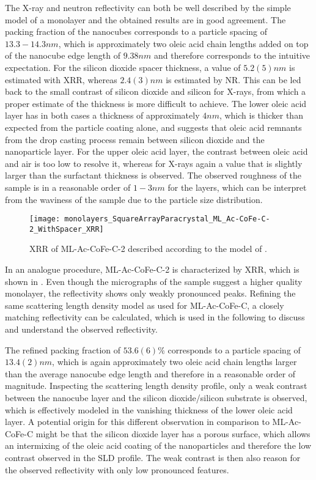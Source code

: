 \documentclass[\main/dresen_thesis.tex]{subfiles}
\begin{document}
  The X-ray and neutron reflectivity can both be well described by the simple model of a monolayer and the obtained results are in good agreement.
  The packing fraction of the nanocubes corresponds to a particle spacing of $13.3 - 14.3 \unit{nm}$, which is approximately two oleic acid chain lengths added on top of the nanocube edge length of $9.38 \unit{nm}$ and therefore corresponds to the intuitive expectation.
  For the silicon dioxide spacer thickness, a value of $5.2(5) \unit{nm}$ is estimated with  XRR, whereas $2.4(3) \unit{nm}$ is estimated by NR.
  This can be led back to the small contrast of silicon dioxide and silicon for X-rays, from which a proper estimate of the thickness is more difficult to achieve.
  The lower oleic acid layer has in both cases a thickness of approximately $4 \unit{nm}$, which is thicker than expected from the particle coating alone, and suggests that oleic acid remnants from the drop casting process remain between silicon dioxide and the nanoparticle layer.
  For the upper oleic acid layer, the contrast between oleic acid and air is too low to resolve it, whereas for X-rays again a value that is slightly larger than the surfactant thickness is observed.
  The observed roughness of the sample is in a reasonable order of $1 - 3 \unit{nm}$ for the layers, which can be interpret from the waviness of the sample \eg due to the particle size distribution.

  \begin{figure}[tb]
    \centering
    \texttt{[image: monolayers\_SquareArrayParacrystal\_ML\_Ac-CoFe-C-2\_WithSpacer\_XRR]}
    \caption{\label{fig:monolayers:structure:squareArrayParacrystal:XRR}XRR of ML-Ac-CoFe-C-2 described according to the model of .}
  \end{figure}

  In an analogue procedure, ML-Ac-CoFe-C-2 is characterized by XRR, which is shown in .
  Even though the micrographs of the sample suggest a higher quality monolayer, the reflectivity shows only weakly pronounced peaks.
  Refining the same scattering length density model as used for ML-Ac-CoFe-C, a closely matching reflectivity can be calculated, which is used in the following to discuss and understand the observed reflectivity.

  The refined packing fraction of $53.6(6) \%$ corresponds to a particle spacing of $13.4(2) \unit{nm}$, which is again approximately two oleic acid chain lengths larger than the average nanocube edge length and therefore in a reasonable order of magnitude.
  Inspecting the scattering length density profile, only a weak contrast between the nanocube layer and the silicon dioxide/silicon substrate is observed, which is effectively modeled in the vanishing thickness of the lower oleic acid layer.
  A potential origin for this different observation in comparison to ML-Ac-CoFe-C might be that the silicon dioxide layer has a porous surface, which allows an intermixing of the oleic acid coating of the nanoparticles and therefore the low contrast observed in the SLD profile.
  The weak contrast is then also reason for the observed reflectivity with only low pronounced features.
\end{document}
